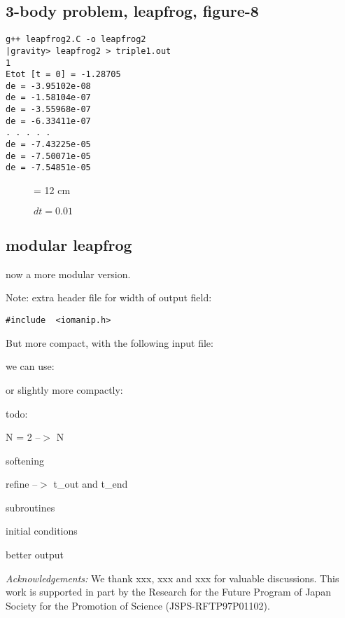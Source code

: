 \subsection{3-body problem, leapfrog, figure-8}



\begin{verbatim}
g++ leapfrog2.C -o leapfrog2
|gravity> leapfrog2 > triple1.out
1
Etot [t = 0] = -1.28705
de = -3.95102e-08
de = -1.58104e-07
de = -3.55968e-07
de = -6.33411e-07
. . . . .
de = -7.43225e-05
de = -7.50071e-05
de = -7.54851e-05
\end{verbatim}

\begin{figure}
\begin{center}
\leavevmode
\epsfxsize = 12 cm
\caption{$dt = 0.01$}
\label{fig:triple1}
\end{center}
\end{figure}

\subsection{modular leapfrog}

now a more modular version.

Note: extra header file for width of output field:

\begin{verbatim}
#include  <iomanip.h>
\end{verbatim}



But more compact, with the following input file:



we can use:



or slightly more compactly:



todo:

N = 2 --$>$ N

softening

refine --$>$ t\_out and t\_end

subroutines

initial conditions

better output



\bigskip

\bigskip

\bigskip

{\it Acknowledgements:}
We thank xxx, xxx and xxx for valuable
discussions.  This work is supported in part by the Research for the
Future Program of Japan Society for the Promotion of Science
(JSPS-RFTP97P01102).


